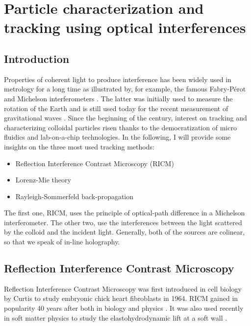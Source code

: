 \newpage
\section{Particle characterization and tracking using optical interferences}
		\label{sec:chapter2}

\subsection{Introduction}

Properties of coherent light to produce interference has been widely used in metrology for a long time as illustrated by, for example, the famous Fabry-Pérot  \cite{fabry_theorie_1899, perot_application_1899} and Michelson interferometers \cite{michelson_relative_1887}. The latter was initially used to measure the rotation of the Earth and is still used today for the recent measurement of gravitational waves
\cite{ligo_scientific_collaboration_and_virgo_collaboration_gw151226_2016}. 
Since the beginning of the century, interest on tracking and characterizing colloidal particles risen thanks to the democratization of micro fluidics and lab-on-a-chip technologies. In the following, I will provide some insights on the three most used tracking methods:

\begin{itemize}
	\item Reflection Interference Contrast Microscopy (\gls{RICM})
	\item Lorenz-Mie theory
	\item Rayleigh-Sommerfeld back-propagation
\end{itemize}

The first one, \gls{RICM}, uses the principle of optical-path difference in a Michelson interferometer. The other two, use the interferences between the light scattered by the colloid and the incident light. Generally, both of the sources are colinear, so that we speak of in-line holography. 



\subsection{Reflection Interference Contrast Microscopy}




Reflection Interference Contrast Microscopy was first introduced in cell biology by Curtis to study embryonic chick heart fibroblasts \cite{curtis_mechanism_1964} in 1964. \gls{RICM} gained in popularity 40 years after both in biology and physics \cite{filler_reflection_2000, siver_use_2000, weber_2_2003, limozin_quantitative_2009, nadal_probing_2002, raedler_measurement_1992}. It was also used recently in soft matter physics to study the elastohydrodynamic lift at a soft wall \cite{davies_elastohydrodynamic_2018}.

